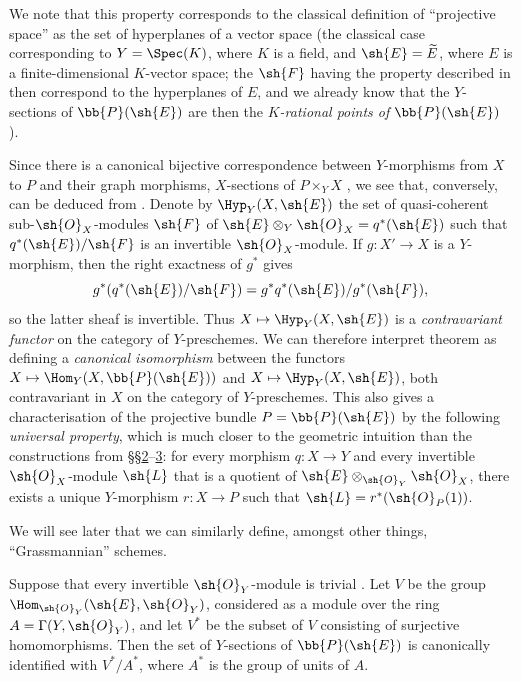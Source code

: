 We note that this property corresponds to the classical definition of ``projective space'' as the set of hyperplanes of a vector space (the classical case corresponding to $Y=\Spec(K)$, where $K$ is a field, and $\sh{E}=\widetilde{E}$, where $E$ is a finite-dimensional $K$-vector space; the $\sh{F}$ having the property described in  then correspond to the hyperplanes of $E$, and we already know that the $Y$-sections of $\bb{P}(\sh{E})$ are then the \emph{$K$-rational points of $\bb{P}(\sh{E})$} ).

\begin{remark}[4.2.5]
\label{II.4.2.5}
Since there is a canonical bijective correspondence between $Y$-morphisms from $X$ to $P$ and their graph morphisms, $X$-sections of $P\times_Y X$ , we see that, conversely,  can be deduced from .
Denote by $\Hyp_Y(X,\sh{E})$ the set of quasi-coherent sub-$\sh{O}_X$-modules $\sh{F}$ of $\sh{E}\otimes_Y\sh{O}_X=q^*(\sh{E})$ such that $q^*(\sh{E})/\sh{F}$ is an invertible $\sh{O}_X$-module.
If $g:X'\to X$ is a $Y$-morphism, then the right exactness of $g^*$ gives
\[
  g^*(q^*(\sh{E})/\sh{F})=g^*q^*(\sh{E})/g^*(\sh{F}),
\]
so the latter sheaf is invertible. Thus $X\mapsto\Hyp_Y(X,\sh{E})$ is a \emph{contravariant functor} on the category of $Y$-preschemes.
We can therefore interpret theorem  as defining a \emph{canonical isomorphism} between the functors $X\mapsto\Hom_Y(X,\bb{P}(\sh{E}))$ and $X\mapsto\Hyp_Y(X,\sh{E})$, both contravariant in $X$ on the category of $Y$-preschemes.
This also gives a characterisation of the projective bundle $P=\bb{P}(\sh{E})$ by the following \emph{universal property}, which is much closer to the geometric intuition than the constructions from §§\hyperref[section:II.2]{2}--\hyperref[section:II.3]{3}:
for every morphism $q:X\to Y$ and every invertible $\sh{O}_X$-module $\sh{L}$ that is a quotient of $\sh{E}\otimes_{\sh{O}_Y}\sh{O}_X$, there exists a unique $Y$-morphism $r:X\to P$ such that $\sh{L}=r^*(\sh{O}_P(1))$.

We will see later that we can similarly define, amongst other things, ``Grassmannian'' schemes.
\end{remark}

\begin{corollary}[4.2.6]
\label{II.4.2.6}
Suppose that every invertible $\sh{O}_Y$-module is trivial .
Let $V$ be the group $\Hom_{\sh{O}_Y}(\sh{E},\sh{O}_Y)$, considered as a module over the ring $A=\Gamma(Y,\sh{O}_Y)$, and let $V^*$ be the subset of $V$ consisting of surjective homomorphisms.
Then the set of $Y$-sections of $\bb{P}(\sh{E})$ is canonically identified with $V^*/A^*$, where $A^*$ is the group of units of $A$.
\end{corollary}

